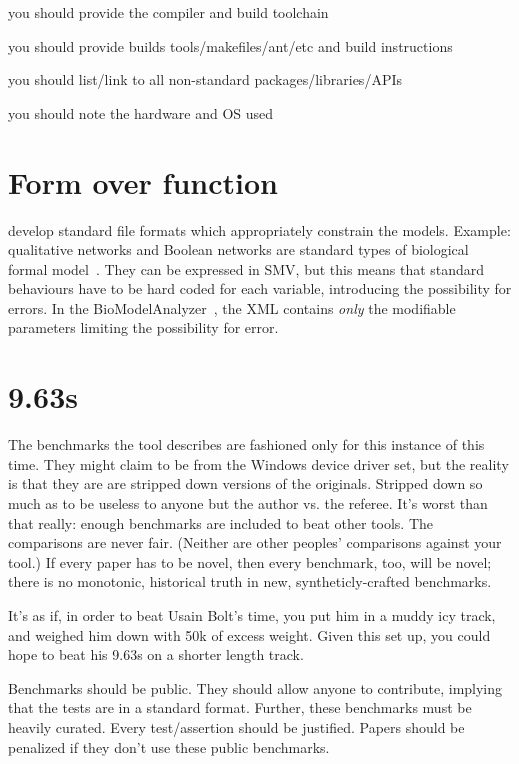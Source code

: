 \documentclass[conference]{IEEEtran}
\begin{document}
you should provide the compiler and build toolchain

you should provide builds tools/makefiles/ant/etc and build instructions

you should list/link to all non-standard packages/libraries/APIs

you should note the hardware and OS used


\section{Form over function}

develop standard file formats which appropriately constrain the
models. Example: qualitative networks and Boolean networks are
standard types of biological formal
model~\cite{Kauffman1969,Schaub2007}. They can be expressed in SMV,
but this means that standard behaviours have to be hard coded for each
variable, introducing the possibility for errors. In the
BioModelAnalyzer~\cite{Benque2012}, the XML contains \emph{only} the
modifiable parameters limiting the possibility for error.


\section{9.63s} 

The benchmarks the tool describes are fashioned only for this instance
of this time. They might claim to be from the Windows device driver
set, but the reality is that they are are stripped down versions of
the originals. Stripped down so much as to be useless to anyone but
the author vs. the referee. It's worst than that really: enough
benchmarks are included to beat other tools. The comparisons are never
fair. (Neither are other peoples' comparisons against your tool.) If
every paper has to be novel, then every benchmark, too, will be novel;
there is no monotonic, historical truth in new, syntheticly-crafted
benchmarks.

It's as if, in order to beat Usain Bolt's time, you put him in a muddy
icy track, and weighed him down with 50k of excess weight. Given this
set up, you could hope to beat his 9.63s on a shorter length track.

Benchmarks should be public. They should allow anyone to contribute,
implying that the tests are in a standard format. Further, these
benchmarks must be heavily curated. Every test/assertion should be
justified. Papers should be penalized if they don't use these public
benchmarks.
\end{document}
